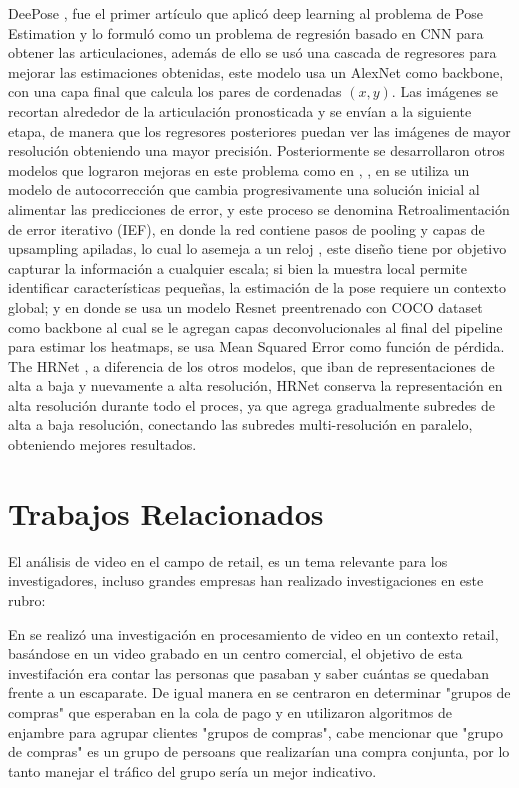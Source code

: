 \documentclass[conference]{IEEEtran}
\begin{document}
DeePose \cite{toshev2014deeppose}, fue el primer artículo que aplicó deep learning al problema de Pose Estimation y lo formuló como un problema de regresión basado en CNN para obtener las articulaciones, además de ello se usó una cascada de regresores para mejorar las estimaciones obtenidas, este modelo usa un AlexNet como backbone, con una capa final que calcula los pares de cordenadas $(x, y)$. Las imágenes se recortan alrededor de la articulación pronosticada y se envían a la siguiente etapa, de manera que los regresores posteriores puedan ver las imágenes de mayor resolución obteniendo una mayor precisión. Posteriormente se desarrollaron otros modelos que lograron mejoras en este problema como en \cite{tompson2015efficient} , \cite{wei2016convolutional}, en \cite{carreira2016human} se utiliza un modelo de autocorrección que cambia progresivamente una solución inicial al alimentar las predicciones de error, y este proceso se denomina Retroalimentación de error iterativo (IEF), en \cite{newell2016stacked} donde la red contiene pasos de pooling y capas de upsampling apiladas, lo cual lo asemeja a un reloj , este diseño tiene por objetivo capturar la información a cualquier escala; si bien la muestra local permite identificar características pequeñas, la estimación de la pose requiere un contexto global; y en  \cite{xiao2018simple} donde se usa un modelo Resnet preentrenado con COCO dataset como backbone al cual se le agregan capas deconvolucionales al final del pipeline para estimar los heatmaps, se usa Mean Squared Error como función de pérdida. The HRNet \cite{sun2019deep} , a diferencia de los otros modelos, que iban de representaciones de alta a baja y nuevamente a alta resolución, HRNet conserva la representación en alta resolución durante todo el proces, ya que agrega gradualmente subredes de alta a baja resolución, conectando las subredes multi-resolución en paralelo, obteniendo mejores resultados. 

\section{Trabajos Relacionados}
El análisis de video en el campo de retail, es un tema relevante para los investigadores, incluso grandes  empresas han realizado investigaciones en este rubro:

En \cite{ellis2002performance} se realizó una investigación en procesamiento de video en un contexto retail, basándose en un video grabado en un centro comercial, el objetivo de esta investifación era contar las personas que pasaban y saber cuántas se quedaban frente a un escaparate. De igual manera en \cite{haritaoglu2001detection} se centraron en determinar "grupos de compras" que esperaban en la cola de pago y en \cite{leykin2007detecting} utilizaron algoritmos de enjambre para agrupar clientes "grupos de compras", cabe mencionar que "grupo de compras" es un grupo de persoans que realizarían una compra conjunta, por lo tanto manejar el tráfico del grupo sería un mejor indicativo.
\end{document}
